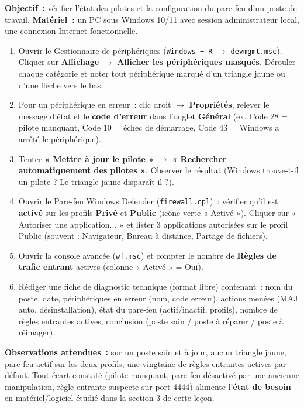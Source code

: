 \documentclass[11pt]{article}
\begin{document}
\begin{experience}
\textbf{Objectif~:} vérifier l'état des pilotes et la configuration du pare-feu d'un poste de travail. \textbf{Matériel~:} un PC sous Windows 10/11 avec session administrateur local, une connexion Internet fonctionnelle.
\begin{enumerate}
  \item Ouvrir le Gestionnaire de périphériques (\texttt{Windows + R} $\rightarrow$ \texttt{devmgmt.msc}). Cliquer sur \textbf{Affichage} $\rightarrow$ \textbf{Afficher les périphériques masqués}. Dérouler chaque catégorie et noter tout périphérique marqué d'un triangle jaune ou d'une flèche vers le bas.
  \item Pour un périphérique en erreur~: clic droit $\rightarrow$ \textbf{Propriétés}, relever le message d'état et le \textbf{code d'erreur} dans l'onglet \textbf{Général} (ex. Code 28 = pilote manquant, Code 10 = échec de démarrage, Code 43 = Windows a arrêté le périphérique).
  \item Tenter \textbf{« Mettre à jour le pilote »} $\rightarrow$ \textbf{« Rechercher automatiquement des pilotes »}. Observer le résultat (Windows trouve-t-il un pilote ? Le triangle jaune disparaît-il ?).
  \item Ouvrir le Pare-feu Windows Defender (\texttt{firewall.cpl})~: vérifier qu'il est \textbf{activé} sur les profils \textbf{Privé} et \textbf{Public} (icône verte « Activé »). Cliquer sur « Autoriser une application... » et lister 3 applications autorisées sur le profil Public (souvent : Navigateur, Bureau à distance, Partage de fichiers).
  \item Ouvrir la console avancée (\texttt{wf.msc}) et compter le nombre de \textbf{Règles de trafic entrant} actives (colonne « Activé » = Oui).
  \item Rédiger une fiche de diagnostic technique (format libre) contenant~: nom du poste, date, périphériques en erreur (nom, code erreur), actions menées (MAJ auto, désinstallation), état du pare-feu (actif/inactif, profils), nombre de règles entrantes actives, conclusion (poste sain / poste à réparer / poste à réimager).
\end{enumerate}
\textbf{Observations attendues~:} sur un poste sain et à jour, aucun triangle jaune, pare-feu actif sur les deux profils, une vingtaine de règles entrantes actives par défaut. Tout écart constaté (pilote manquant, pare-feu désactivé par une ancienne manipulation, règle entrante suspecte sur port 4444) alimente l'\textbf{état de besoin} en matériel/logiciel étudié dans la section 3 de cette leçon.
\end{experience}
\end{document}
